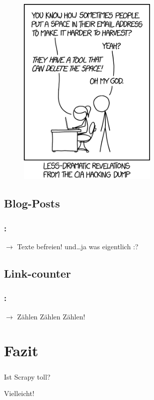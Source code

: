 \documentclass{beamer}
\begin{document}
\begin{figure}
	\begin{center}
		\includegraphics[width=0.6\textwidth]{texsrc/hacking_xkcd}
	\end{center}
	\label{fig:XKCD_HACKING}
\end{figure}

\subsection{Blog-Posts}
\begin{frame}
	\frametitle{\insertsection{}: \insertsubsection{}}	
	$\rightarrow$ Texte befreien! und\ldots ja was eigentlich :?
\end{frame}

\subsection{Link-counter}
\begin{frame}
	\frametitle{\insertsection{}: \insertsubsection{}}
	$\rightarrow$ Zählen Zählen Zählen!
\end{frame}


\section{Fazit}
\begin{frame}
	\frametitle{\insertsection{}}
Ist Scrapy toll?

Vielleicht!
\end{frame}
\end{document}
